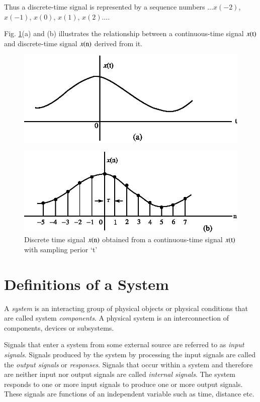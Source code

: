 Thus a discrete-time signal is represented by a sequence numbers $\ldots x(-2)$, $x(-1)$, $x(0)$, $x(1)$, $x(2)\ldots$.

Fig. \ref{chap1-fig1.2}(a) and (b) illustrates the relationship between a continuous-time signal $x(\textrm{t})$ and discrete-time signal $x(\textrm{n})$ derived from it.
\begin{figure}[H]
\centering
\includegraphics{src/chap1/fig2.eps}
\end{figure}
\bigskip

\begin{figure}[H]
\centering
\includegraphics{src/chap1/fig3.eps}
\caption{Discrete time signal $x(\textrm{n})$ obtained from a continuous-time signal $x(\textrm{t})$ with sampling perior `t'}\label{chap1-fig1.2}
\end{figure}

\section{Definitions of a System}

A {\em system} is an interacting group of physical objects or physical conditions that are called system {\em components}. A physical system is an interconnection of components, devices or subsystems.

Signals that enter a system from some external source are referred to as {\em input signals}. Signals produced by the system by processing the input signals are called the {\em output signals} or {\em responses}. Signals that occur within a system and therefore are neither input nor output signals are called {\em internal signals}. The system responds to one or more input signals to produce one or more output signals. These signals are functions of an independent variable such as time, distance etc.

